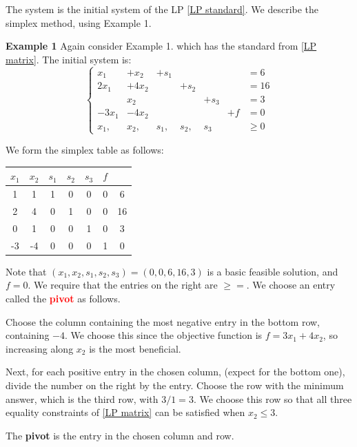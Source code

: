 The system is the initial system of the LP \ref{LP standard}. We describe the simplex method, using Example 1.

\noindent \textbf{Example 1} Again consider Example 1. which has the standard from \ref{LP matrix}. The initial system is:
\begin{equation}
    \left\lbrace\begin{array}{ccccccc}
     x_1 &+x_2 & +s_1 &&&   &=6  \\
     2x_1 &+4x_2 &&+s_2&&& = 16\\
     &x_2&&&+s_3&&=3\\
     -3x_1&-4x_2&&&&+f&=0\\
       x_1,&x_2,&s_1,&s_2,&s_3&  &\ge 0
    \end{array}    \right.\nonumber
\end{equation}

We form the simplex table as follows:
\begin{center}
    \begin{tabular}{cccccc|c}
        $x_1$ & $x_2$ & $s_1$ & $s_2$ & $s_3$ & $f$ & \\
        \hline
        1 & 1 & 1 & 0 & 0 & 0 & 6\\
        2 & 4 & 0 & 1 & 0 & 0 & 16\\
        0 & 1 & 0 & 0 & 1 & 0 & 3\\
        \hline
        -3 & -4 & 0 & 0 & 0 & 1 & 0\\
        \hline
    \end{tabular}
\end{center}

Note that $(x_1, x_2, s_1, s_2, s_3) = (0, 0, 6, 16, 3)$ is a basic feasible solution,  and $f = 0$. We require that the entries on the right are $\ge =$. We choose an entry called the \textcolor{red}{\textbf{pivot}} as follows.

 Choose the column containing the most negative entry in the bottom row, containing $-4$. We choose this since the objective function is $f = 3x_1 + 4x_2$, so increasing along $x_2$ is the most beneficial.

 Next, for each positive entry in the chosen column, (expect for the bottom one), divide the number on the right by the entry. Choose the row with the minimum answer, which is the third row, with $3/1 = 3$. We choose this row so that all three equality constraints of \ref{LP matrix} can be satisfied when $x_2\le 3$. 

The \textbf{pivot} is the entry in the chosen column and row.

